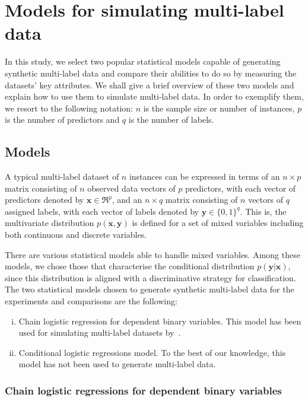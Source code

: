 \documentclass[review]{elsarticle}
\begin{document}
	
	\section{Models for simulating multi-label data}
	\label{MODELS}
	
	In this study, we select two popular statistical models capable of generating synthetic multi-label data and compare their abilities to do so by measuring the datasets' key attributes. We shall give a brief overview of these two models and explain how to use them to simulate multi-label data.  In order to exemplify them, we resort to the following notation: $n$ is the sample size or number of instances, $p$ is the number of predictors and $q$ is the number of labels.
	
	\subsection{Models}\label{ss:models}
	
	A typical multi-label dataset of $n$ instances can be expressed in terms of an $n\times p$ matrix consisting of $n$ observed data vectors of $p$ predictors, with each vector of predictors denoted by $\mathbf{x} \in \Re^{p}$, and an $n\times q$ matrix consisting of $n$ vectors of $q$ assigned labels, with each vector of labels denoted by $\mathbf{y} \in \{ 0,1 \}^{q}$. This is, the multivariate distribution $p(\mathbf{x},\mathbf{y})$ is defined for a set of mixed variables including both continuous and discrete variables.
	
	There are various statistical models able to handle mixed variables. Among these models, we chose those that characterise the conditional distribution $p(\mathbf{y}|\mathbf{x})$, since this distribution is aligned with a discriminative strategy for classification.
	The two statistical models chosen to generate synthetic multi-label data for the experiments and comparisons are the following:
	\begin{enumerate}[(i)]
		\item Chain logistic regression for dependent binary variables. This model has been used for simulating multi-label datasets by~\citet{PCC}.
		\item Conditional logistic regressions model. To the best of our knowledge, this model has not been used to generate multi-label data.
	\end{enumerate}
	
	\subsubsection{Chain logistic regressions for dependent binary variables}
	
\end{document}
